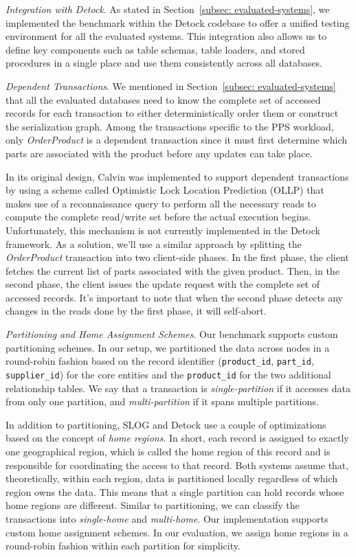 \textit{Integration with Detock}. As stated in Section~\ref{subsec: evaluated-systems}, we implemented the benchmark within the Detock codebase to offer a unified testing environment for all the evaluated systems. This integration also allows us to define key components such as table schemas, table loaders, and stored procedures in a single place and use them consistently across all databases.

\textit{Dependent Transactions}. We mentioned in Section~\ref{subsec: evaluated-systems} that all the evaluated databases need to know the complete set of accessed records for each transaction to either deterministically order them or construct the serialization graph. Among the transactions specific to the PPS workload, only \textit{OrderProduct} is a dependent transaction since it must first determine which parts are associated with the product before any updates can take place. 

In its original design, Calvin was implemented to support dependent transactions by using a scheme called Optimistic Lock Location Prediction (OLLP) that makes use of a reconnaissance query to perform all the necessary reads to compute the complete read/write set before the actual execution begins. Unfortunately, this mechanism is not currently implemented in the Detock framework. As a solution, we'll use a similar approach by splitting the \textit{OrderProduct} transaction into two client-side phases. In the first phase, the client fetches the current list of parts associated with the given product. Then, in the second phase, the client issues the update request with the complete set of accessed records. It's important to note that when the second phase detects any changes in the reads done by the first phase, it will self-abort.

\textit{Partitioning and Home Assignment Schemes}. Our benchmark supports custom partitioning schemes. In our setup, we partitioned the data across nodes in a round-robin fashion based on the record identifier (\texttt{product\_id}, \texttt{part\_id}, \texttt{supplier\_id}) for the core entities and the \texttt{product\_id} for the two additional relationship tables. We say that a transaction is \textit{single-partition} if it accesses data from only one partition, and \textit{multi-partition} if it spans multiple partitions.

In addition to partitioning, SLOG and Detock use a couple of optimizations based on the concept of \textit{home regions}. In short, each record is assigned to exactly one geographical region, which is called the home region of this record and is responsible for coordinating the access to that record. Both systems assume that, theoretically, within each region, data is partitioned locally regardless of which region owns the data. This means that a single partition can hold records whose home regions are different. Similar to partitioning, we can classify the transactions into \textit{single-home} and \textit{multi-home}. Our implementation supports custom home assignment schemes. In our evaluation, we assign home regions in a round-robin fashion within each partition for simplicity.

